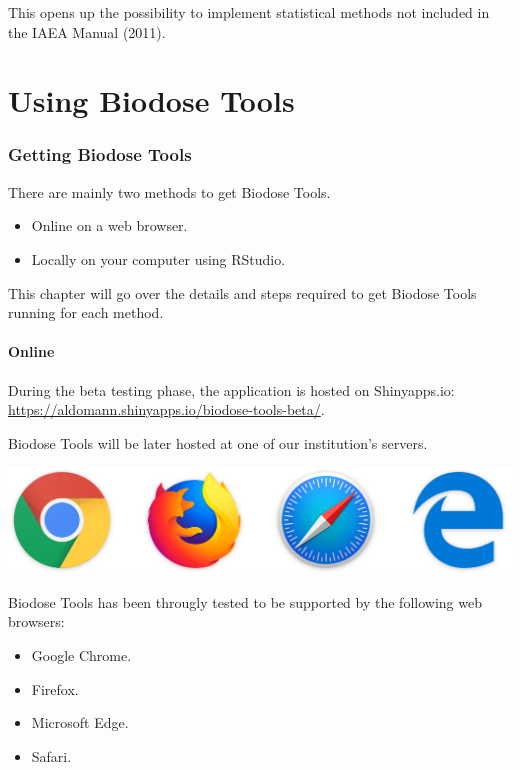 \documentclass[]{scrartcl}
\providecommand{\tightlist}{%
  \setlength{\itemsep}{0pt}\setlength{\parskip}{0pt}}
\begin{document}
This opens up the possibility to implement statistical methods not included in the IAEA Manual (2011).

\hypertarget{part-using-biodose-tools}{%
\part{Using Biodose Tools}\label{part-using-biodose-tools}}

\hypertarget{manual-get}{%
\section{Getting Biodose Tools}\label{manual-get}}

There are mainly two methods to get Biodose Tools.

\begin{itemize}
\tightlist
\item
  Online on a web browser. 
\item
  Locally on your computer using RStudio.
\end{itemize}

This chapter will go over the details and steps required to get Biodose Tools running for each method.

\hypertarget{manual-get-online}{%
\subsection{Online}\label{manual-get-online}}

During the beta testing phase, the application is hosted on Shinyapps.io: \url{https://aldomann.shinyapps.io/biodose-tools-beta/}.

Biodose Tools will be later hosted at one of our institution's servers.

\begin{center}\includegraphics[width=0.6\linewidth]{images/user-manual/browsers} \end{center}

Biodose Tools has been througly tested to be supported by the following web browsers:

\begin{itemize}
\tightlist
\item
  Google Chrome.
\item
  Firefox.
\item
  Microsoft Edge.
\item
  Safari.
\end{itemize}
\end{document}
